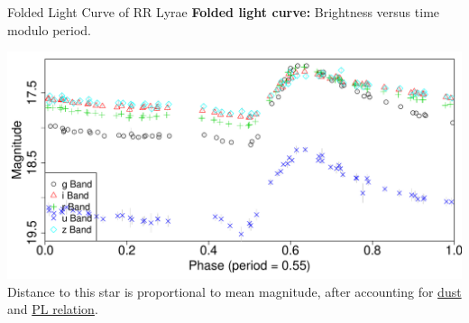 \documentclass[12pt]{beamer}
\begin{document}
\begin{frame}{Folded Light Curve of RR Lyrae}
\textbf{Folded light curve:} Brightness versus time modulo period.
\begin{center}
\includegraphics[scale=.3]{figs/folded_13350.pdf}\\
Distance to this star is proportional to mean magnitude, after accounting for \underline{dust} and \underline{PL relation}.
\end{center}
\end{frame}
\end{document}

